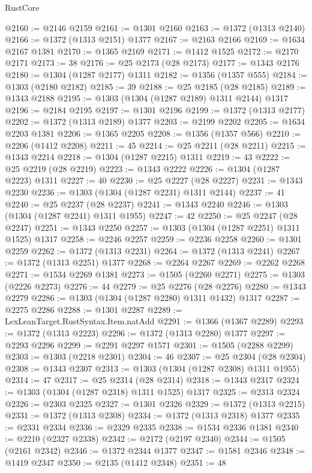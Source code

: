 \begin{lexlean}{RustCore}
\begin{coremodule}
@2160 := @2146 @2159
@2161 := @1301 @2160
@2163 := @1372 (@1313 @2140)
@2166 := @1372 (@1313 @2151) @1377
@2167 := @2163 @2166
@2169 := @1634 @2167 @1381
@2170 := @1365 @2169
@2171 := @1412 @1525
@2172 := @2170 @2171
@2173 := 38
@2176 := @25 @2173 (@28 @2173)
@2177 := @1343 @2176
@2180 := @1304 (@1287 @2177) @1311
@2182 := @1356 (@1357 @555)
@2184 := @1303 (@2180 @2182)
@2185 := 39
@2188 := @25 @2185 (@28 @2185)
@2189 := @1343 @2188
@2195 := @1303 (@1304 (@1287 @2189) @1311 @2144) @1317
@2196 := @2184 @2195
@2197 := @1301 @2196
@2199 := @1372 (@1313 @2177)
@2202 := @1372 (@1313 @2189) @1377
@2203 := @2199 @2202
@2205 := @1634 @2203 @1381
@2206 := @1365 @2205
@2208 := @1356 (@1357 @566)
@2210 := @2206 (@1412 @2208)
@2211 := 45
@2214 := @25 @2211 (@28 @2211)
@2215 := @1343 @2214
@2218 := @1304 (@1287 @2215) @1311
@2219 := 43
@2222 := @25 @2219 (@28 @2219)
@2223 := @1343 @2222
@2226 := @1304 (@1287 @2223) @1311
@2227 := 40
@2230 := @25 @2227 (@28 @2227)
@2231 := @1343 @2230
@2236 := @1303 (@1304 (@1287 @2231) @1311 @2144)
@2237 := 41
@2240 := @25 @2237 (@28 @2237)
@2241 := @1343 @2240
@2246 := @1303 (@1304 (@1287 @2241) @1311 @1955)
@2247 := 42
@2250 := @25 @2247 (@28 @2247)
@2251 := @1343 @2250
@2257 := @1303 (@1304 (@1287 @2251) @1311 @1525) @1317
@2258 := @2246 @2257
@2259 := @2236 @2258
@2260 := @1301 @2259
@2262 := @1372 (@1313 @2231)
@2264 := @1372 (@1313 @2241)
@2267 := @1372 (@1313 @2251) @1377
@2268 := @2264 @2267
@2269 := @2262 @2268
@2271 := @1534 @2269 @1381
@2273 := @1505 (@2260 @2271)
@2275 := @1303 (@2226 @2273)
@2276 := 44
@2279 := @25 @2276 (@28 @2276)
@2280 := @1343 @2279
@2286 := @1303 (@1304 (@1287 @2280) @1311 @1432) @1317
@2287 := @2275 @2286
@2288 := @1301 @2287
@2289 := LexLeanTarget.RustSyntax.Item.natAdd
@2291 := @1366 (@1367 @2289)
@2293 := @1372 (@1313 @2223)
@2296 := @1372 (@1313 @2280) @1377
@2297 := @2293 @2296
@2299 := @2291 @2297 @1571
@2301 := @1505 (@2288 @2299)
@2303 := @1303 (@2218 @2301)
@2304 := 46
@2307 := @25 @2304 (@28 @2304)
@2308 := @1343 @2307
@2313 := @1303 (@1304 (@1287 @2308) @1311 @1955)
@2314 := 47
@2317 := @25 @2314 (@28 @2314)
@2318 := @1343 @2317
@2324 := @1303 (@1304 (@1287 @2318) @1311 @1525) @1317
@2325 := @2313 @2324
@2326 := @2303 @2325
@2327 := @1301 @2326
@2329 := @1372 (@1313 @2215)
@2331 := @1372 (@1313 @2308)
@2334 := @1372 (@1313 @2318) @1377
@2335 := @2331 @2334
@2336 := @2329 @2335
@2338 := @1534 @2336 @1381
@2340 := @2210 (@2327 @2338)
@2342 := @2172 (@2197 @2340)
@2344 := @1505 (@2161 @2342)
@2346 := @1372 @2344 @1377
@2347 := @1581 @2346
@2348 := @1419 @2347
@2350 := @2135 (@1412 @2348)
@2351 := 48

\end{coremodule}
\end{lexlean}

